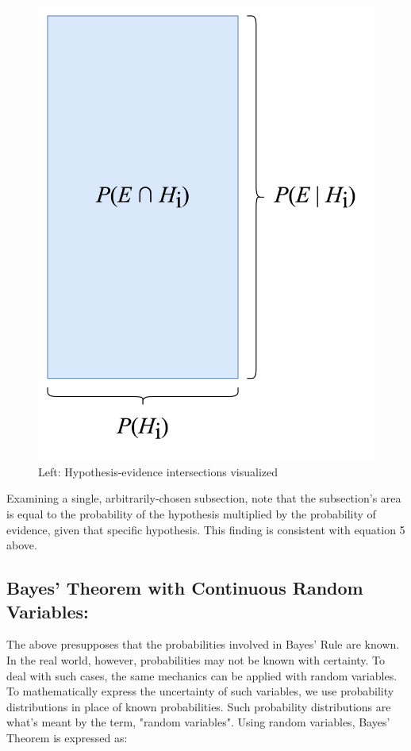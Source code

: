 \documentclass[12pt]{article}
\begin{document}
\begin{figure}[h!]
\begin{minipage}{0.28\textwidth}
        \includegraphics[width=\textwidth]{assets/visual_6.png}
    \end{minipage}
    \caption{Left: Hypothesis-evidence intersections visualized}
    \label{fig:both_visuals}
\end{figure}

\noindent Examining a single, arbitrarily-chosen subsection, note that the subsection's area is equal to the probability of the hypothesis multiplied by the probability of evidence, given that specific hypothesis. This finding is consistent with equation 5 above.

\newpage

\subsection*{Bayes' Theorem with Continuous Random Variables:}
\noindent The above presupposes that the probabilities involved in Bayes' Rule are known. In the real world, however, probabilities may not be known with certainty. To deal with such cases, the same mechanics can be applied with random variables. To mathematically express the uncertainty of such variables, we use probability distributions in place of known probabilities. Such probability distributions are what's meant by the term, "random variables". Using random variables, Bayes' Theorem is expressed as:
\end{document}
